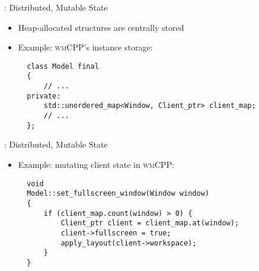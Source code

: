 \begin{frame}[fragile]{\underline{\cpp}: Distributed, Mutable State \hfill {\footnotesize \currentname}}


    \begin{itemize}

        \item Heap-allocated  structures are centrally stored

    \item Example: \textsc{wmCPP}'s  instance storage:\\[3pt]
\begin{verbatim}
  class Model final
  {
      // ...
  private:
      std::unordered_map<Window, Client_ptr> client_map;
      // ...
  };
\end{verbatim}

    \end{itemize}

    \vfill

\end{frame}

\begin{frame}[fragile]{\underline{\cpp}: Distributed, Mutable State \hfill {\footnotesize \currentname}}


    \begin{itemize}

    \item Example: mutating client state in \textsc{wmCPP}:\\[3pt]
\begin{verbatim}
  void
  Model::set_fullscreen_window(Window window)
  {
      if (client_map.count(window) > 0) {
          Client_ptr client = client_map.at(window);
          client->fullscreen = true;
          apply_layout(client->workspace);
      }
  }
\end{verbatim}

    \end{itemize}

    \vfill

\end{frame}
